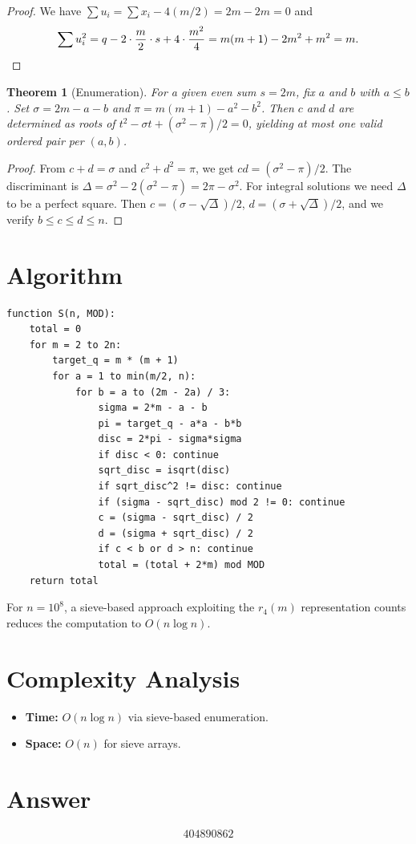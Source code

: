 \documentclass[11pt]{article}
\newtheorem{theorem}{Theorem}
\begin{document}
\begin{proof}
We have $\sum u_i = \sum x_i - 4(m/2) = 2m - 2m = 0$ and
\[
\sum u_i^2 = q - 2 \cdot \frac{m}{2} \cdot s + 4 \cdot \frac{m^2}{4} = m(m+1) - 2m^2 + m^2 = m. \qedhere
\]
\end{proof}

\begin{theorem}[Enumeration]
For a given even sum $s = 2m$, fix $a$ and $b$ with $a \le b$. Set $\sigma = 2m - a - b$ and $\pi = m(m+1) - a^2 - b^2$. Then $c$ and $d$ are determined as roots of $t^2 - \sigma t + (\sigma^2 - \pi)/2 = 0$, yielding at most one valid ordered pair per $(a,b)$.
\end{theorem}

\begin{proof}
From $c + d = \sigma$ and $c^2 + d^2 = \pi$, we get $cd = (\sigma^2 - \pi)/2$. The discriminant is $\Delta = \sigma^2 - 2(\sigma^2 - \pi) = 2\pi - \sigma^2$. For integral solutions we need $\Delta$ to be a perfect square. Then $c = (\sigma - \sqrt{\Delta})/2$, $d = (\sigma + \sqrt{\Delta})/2$, and we verify $b \le c \le d \le n$.
\end{proof}

\section{Algorithm}

\begin{verbatim}
function S(n, MOD):
    total = 0
    for m = 2 to 2n:
        target_q = m * (m + 1)
        for a = 1 to min(m/2, n):
            for b = a to (2m - 2a) / 3:
                sigma = 2*m - a - b
                pi = target_q - a*a - b*b
                disc = 2*pi - sigma*sigma
                if disc < 0: continue
                sqrt_disc = isqrt(disc)
                if sqrt_disc^2 != disc: continue
                if (sigma - sqrt_disc) mod 2 != 0: continue
                c = (sigma - sqrt_disc) / 2
                d = (sigma + sqrt_disc) / 2
                if c < b or d > n: continue
                total = (total + 2*m) mod MOD
    return total
\end{verbatim}

For $n = 10^8$, a sieve-based approach exploiting the $r_4(m)$ representation counts reduces the computation to $O(n \log n)$.

\section{Complexity Analysis}

\begin{itemize}
    \item \textbf{Time:} $O(n \log n)$ via sieve-based enumeration.
    \item \textbf{Space:} $O(n)$ for sieve arrays.
\end{itemize}

\section{Answer}

\[
\boxed{404890862}
\]
\end{document}
